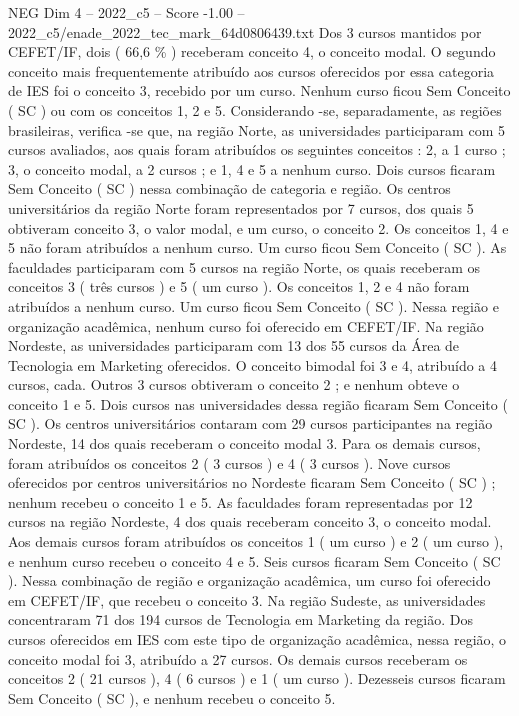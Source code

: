 \begin{textsample}{NEG Dim 4 – 2022\_c5 – Score -1.00 – 2022\_c5/enade\_2022\_tec\_mark\_64d0806439.txt}
Dos 3 cursos mantidos por CEFET/IF, dois ( 66,6 \% ) receberam conceito 4, o conceito modal.
O segundo conceito mais frequentemente atribuído aos cursos oferecidos por essa categoria de IES foi o conceito 3, recebido por um curso.
Nenhum curso ficou Sem Conceito ( SC ) ou com os conceitos 1, 2 e 5.
Considerando -se, separadamente, as regiões brasileiras, verifica -se que, na região Norte, as universidades participaram com 5 cursos avaliados, aos quais foram atribuídos os seguintes conceitos : 2, a 1 curso ; 3, o conceito modal, a 2 cursos ; e 1, 4 e 5 a nenhum curso.
Dois cursos ficaram Sem Conceito ( SC ) nessa combinação de categoria e região.
Os centros universitários da região Norte foram representados por 7 cursos, dos quais 5 obtiveram conceito 3, o valor modal, e um curso, o conceito 2.
Os conceitos 1, 4 e 5 não foram atribuídos a nenhum curso.
Um curso ficou Sem Conceito ( SC ).
As faculdades participaram com 5 cursos na região Norte, os quais receberam os conceitos 3 ( três cursos ) e 5 ( um curso ).
Os conceitos 1, 2 e 4 não foram atribuídos a nenhum curso.
Um curso ficou Sem Conceito ( SC ).
Nessa região e organização acadêmica, nenhum curso foi oferecido em CEFET/IF.
Na região Nordeste, as universidades participaram com 13 dos 55 cursos da Área de Tecnologia em Marketing oferecidos.
O conceito bimodal foi 3 e 4, atribuído a 4 cursos, cada.
Outros 3 cursos obtiveram o conceito 2 ; e nenhum obteve o conceito 1 e 5.
Dois cursos nas universidades dessa região ficaram Sem Conceito ( SC ).
Os centros universitários contaram com 29 cursos participantes na região Nordeste, 14 dos quais receberam o conceito modal 3.
Para os demais cursos, foram atribuídos os conceitos 2 ( 3 cursos ) e 4 ( 3 cursos ).
Nove cursos oferecidos por centros universitários no Nordeste ficaram Sem Conceito ( SC ) ; nenhum recebeu o conceito 1 e 5.
As faculdades foram representadas por 12 cursos na região Nordeste, 4 dos quais receberam conceito 3, o conceito modal.
Aos demais cursos foram atribuídos os conceitos 1 ( um curso ) e 2 ( um curso ), e nenhum curso recebeu o conceito 4 e 5.
Seis cursos ficaram Sem Conceito ( SC ).
Nessa combinação de região e organização acadêmica, um curso foi oferecido em CEFET/IF, que recebeu o conceito 3.
Na região Sudeste, as universidades concentraram 71 dos 194 cursos de Tecnologia em Marketing da região.
Dos cursos oferecidos em IES com este tipo de organização acadêmica, nessa região, o conceito modal foi 3, atribuído a 27 cursos.
Os demais cursos receberam os conceitos 2 ( 21 cursos ), 4 ( 6 cursos ) e 1 ( um curso ).
Dezesseis cursos ficaram Sem Conceito ( SC ), e nenhum recebeu o conceito 5.

\end{textsample}
